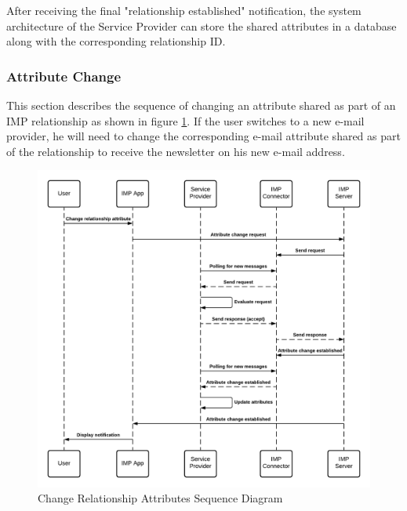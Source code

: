 After receiving the final "relationship established" notification, the system architecture of the Service Provider can store the shared attributes in a database along with the corresponding relationship ID.

\subsubsection{Attribute Change}
This section describes the sequence of changing an attribute shared as part of an IMP relationship as shown in figure \ref{imp:attribute_change}. If the user switches to a new e-mail provider, he will need to change the corresponding e-mail attribute shared as part of the relationship to receive the newsletter on his new e-mail address.

\begin{figure}[h]
    \centering
    \includegraphics[scale=0.6]{Diagrams/IMP Use Case Change Realtionship Attribute Sequence Diagram.pdf}
    \caption{Change Relationship Attributes Sequence Diagram}
    \label{imp:attribute_change}
\end{figure}

